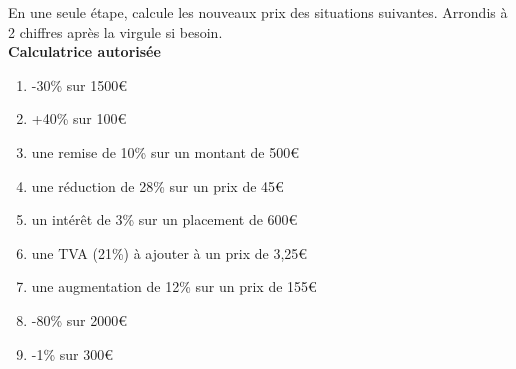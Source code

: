 %
%
	En une seule étape, calcule les nouveaux prix des situations suivantes. Arrondis à 2 chiffres après la virgule si besoin. \\
	\textbf{Calculatrice autorisée}
	\begin{enumerate}[cols=2]
		\item -30\% sur 1500€
		\item +40\% sur 100€
		\item une remise de 10\% sur un montant de 500€
		\item une réduction de 28\% sur un prix de 45€
		\item un intérêt de 3\% sur un placement de 600€
		\item une TVA (21\%) à ajouter à un prix de 3,25€
		\item une augmentation de 12\% sur un prix de 155€
		\item -80\% sur 2000€
		\item -1\% sur 300€
	\end{enumerate}
